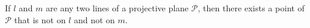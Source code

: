 If $l$ and $m$ are any two lines of a projective plane $\mathcal{P}$, then there exists a point of $\mathcal{P}$ that is not on $l$ and not on $m$.
